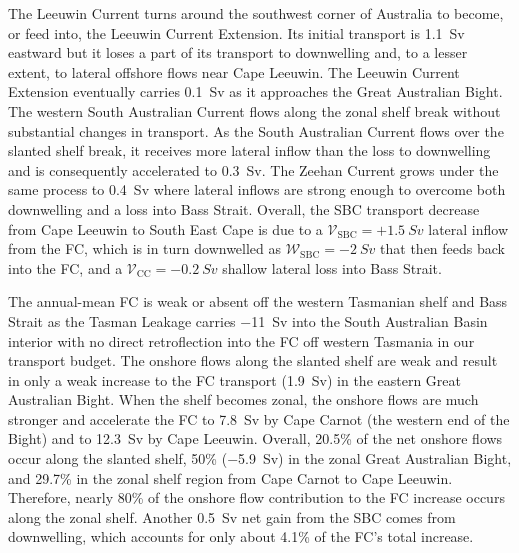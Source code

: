 \documentclass[preprint,3p,review,12pt]{elsarticle}
\newcommand{\sub}[1]{_{\text{#1}}}
\begin{document}
The Leeuwin Current turns around the southwest corner of Australia
to become, or feed into, the Leeuwin Current Extension\@.
Its initial transport is \SI{1.1}{Sv} eastward
but it
loses a part of its transport to downwelling
and, to a lesser extent, to lateral offshore flows near Cape Leeuwin. The Leeuwin Current Extension eventually carries \SI{0.1}{Sv} as it approaches the Great Australian Bight.
The western South Australian Current flows along the zonal shelf break
without substantial changes in transport.
As the South Australian Current flows over the slanted shelf break, it receives more lateral inflow than the loss to downwelling and is consequently accelerated to \SI{0.3}{Sv}.
The Zeehan Current grows under the same process to \SI{0.4}{Sv} where lateral inflows are strong enough to overcome both downwelling
and a loss into Bass Strait.
Overall, the SBC transport
decrease from Cape Leeuwin to South East Cape
is due to
a $\mathcal{V}\sub{SBC} = +\SI{1.5}{Sv}$ lateral inflow 
from the FC, which is in turn downwelled as $\mathcal{W}\sub{SBC} = \SI{-2}{Sv}$ that then feeds back into the FC, and a $\mathcal{V}\sub{CC} = \SI{-0.2}{Sv}$ shallow lateral loss into Bass Strait.

The annual-mean FC is weak or absent
off the western Tasmanian shelf and Bass Strait
as the Tasman Leakage carries \SI{-11}{Sv} into the South Australian Basin interior with no direct retroflection into the FC off western Tasmania in our transport budget. The onshore flows along the slanted shelf are weak and result
in only a weak increase to the FC transport (\SI{1.9}{Sv})
in the eastern Great Australian Bight. When the shelf becomes zonal, the onshore flows are much stronger and
accelerate the FC to
\SI{7.8}{Sv} by Cape Carnot
(the western end of the Bight)
and to \SI{12.3}{Sv} by Cape Leeuwin.
Overall, 20.5\% of the net onshore flows occur along the slanted shelf, 50\% (\SI{-5.9}{Sv})
in the zonal Great Australian Bight,
and 29.7\% in the zonal shelf region from Cape Carnot to Cape Leeuwin. Therefore, nearly 80\% of the onshore flow contribution to the FC increase occurs along the zonal shelf. Another \SI{+0.5}{Sv} net gain from the SBC comes from
downwelling, which
accounts for only about 4.1\% of the FC's total increase.
\end{document}
